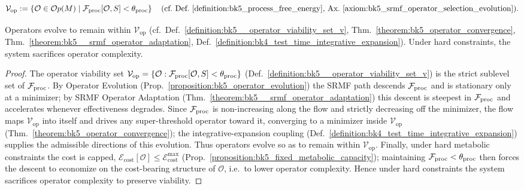 \begin{definition} \label{definition:bk5__operator_viability_set_v}

\[
\mathcal{V}_{\text{op}} := \left\{ \mathcal{O} \in \mathcal{O}p(M) \mid \mathcal{F}_{\text{proc}}[\mathcal{O}, S] < \theta_{\text{proc}} \right\} \quad \text{(cf.~Def.~\ref{definition:bk5_process_free_energy}, Ax.~\ref{axiom:bk5_srmf_operator_selection_evolution})}.
\]
\end{definition}
\begin{proposition}
\label{proposition:bk5_operators_evolve}
\leavevmode\newline
Operators evolve to remain within $\mathcal{V}_{\text{op}}$
(cf.~Def.~\ref{definition:bk5__operator_viability_set_v},
Thm.~\ref{theorem:bk5_operator_convergence},
Thm.~\ref{theorem:bk5__srmf_operator_adaptation},
Def.~\ref{definition:bk4_test_time_integrative_expansion}).
Under hard constraints, the system sacrifices operator complexity.
\end{proposition}
\begin{proof}
\label{proof:bk5_operators_evolve}
\leavevmode
The operator viability set $\mathcal{V}_{\text{op}}=\{\mathcal{O}:\mathcal{F}_{\text{proc}}[\mathcal{O},S]<\theta_{\text{proc}}\}$ (Def.~\ref{definition:bk5__operator_viability_set_v}) is the strict sublevel set of $\mathcal{F}_{\text{proc}}$. By Operator Evolution (Prop.~\ref{proposition:bk5_operator_evolution}) the SRMF path descends $\mathcal{F}_{\text{proc}}$ and is stationary only at a minimizer; by SRMF Operator Adaptation (Thm.~\ref{theorem:bk5__srmf_operator_adaptation}) this descent is steepest in $\mathcal{F}_{\text{proc}}$ and accelerates whenever effectiveness degrades. Since $\mathcal{F}_{\text{proc}}$ is non-increasing along the flow and strictly decreasing off the minimizer, the flow maps $\mathcal{V}_{\text{op}}$ into itself and drives any super-threshold operator toward it, converging to a minimizer inside $\mathcal{V}_{\text{op}}$ (Thm.~\ref{theorem:bk5_operator_convergence}); the integrative-expansion coupling (Def.~\ref{definition:bk4_test_time_integrative_expansion}) supplies the admissible directions of this evolution. Thus operators evolve so as to remain within $\mathcal{V}_{\text{op}}$. Finally, under hard metabolic constraints the cost is capped, $\mathcal{E}_{\text{cost}}[\mathcal{O}]\le\mathcal{E}_{\text{cost}}^{\max}$ (Prop.~\ref{proposition:bk5_fixed_metabolic_capacity}); maintaining $\mathcal{F}_{\text{proc}}<\theta_{\text{proc}}$ then forces the descent to economize on the cost-bearing structure of $\mathcal{O}$, i.e.\ to lower operator complexity. Hence under hard constraints the system sacrifices operator complexity to preserve viability.
\end{proof}
